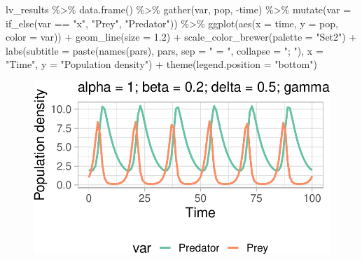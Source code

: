 \documentclass[
  letterpaper,
  DIV=11,
  numbers=noendperiod]{scrartcl}
\newenvironment{Shaded}{\begin{snugshade}}{\end{snugshade}}
\newcommand{\AttributeTok}[1]{\textcolor[rgb]{0.40,0.45,0.13}{#1}}
\newcommand{\FloatTok}[1]{\textcolor[rgb]{0.68,0.00,0.00}{#1}}
\newcommand{\FunctionTok}[1]{\textcolor[rgb]{0.28,0.35,0.67}{#1}}
\newcommand{\NormalTok}[1]{\textcolor[rgb]{0.00,0.23,0.31}{#1}}
\newcommand{\SpecialCharTok}[1]{\textcolor[rgb]{0.37,0.37,0.37}{#1}}
\newcommand{\StringTok}[1]{\textcolor[rgb]{0.13,0.47,0.30}{#1}}
\begin{document}
\begin{Shaded}
\begin{Highlighting}[]
\NormalTok{lv\_results }\SpecialCharTok{\%\textgreater{}\%} 
  \FunctionTok{data.frame}\NormalTok{() }\SpecialCharTok{\%\textgreater{}\%} 
  \FunctionTok{gather}\NormalTok{(var, pop, }\SpecialCharTok{{-}}\NormalTok{time) }\SpecialCharTok{\%\textgreater{}\%} 
  \FunctionTok{mutate}\NormalTok{(}\AttributeTok{var =} \FunctionTok{if\_else}\NormalTok{(var }\SpecialCharTok{==} \StringTok{"x"}\NormalTok{, }\StringTok{"Prey"}\NormalTok{, }\StringTok{"Predator"}\NormalTok{)) }\SpecialCharTok{\%\textgreater{}\%} 
  \FunctionTok{ggplot}\NormalTok{(}\FunctionTok{aes}\NormalTok{(}\AttributeTok{x =}\NormalTok{ time, }\AttributeTok{y =}\NormalTok{ pop, }\AttributeTok{color =}\NormalTok{ var)) }\SpecialCharTok{+}
    \FunctionTok{geom\_line}\NormalTok{(}\AttributeTok{size =} \FloatTok{1.2}\NormalTok{) }\SpecialCharTok{+}
    \FunctionTok{scale\_color\_brewer}\NormalTok{(}\AttributeTok{palette =} \StringTok{"Set2"}\NormalTok{) }\SpecialCharTok{+}
    \FunctionTok{labs}\NormalTok{(}\AttributeTok{subtitle =} \FunctionTok{paste}\NormalTok{(}\FunctionTok{names}\NormalTok{(pars), pars, }\AttributeTok{sep =} \StringTok{" = "}\NormalTok{, }\AttributeTok{collapse =} \StringTok{"; "}\NormalTok{),}
         \AttributeTok{x =} \StringTok{"Time"}\NormalTok{, }\AttributeTok{y =} \StringTok{"Population density"}\NormalTok{) }\SpecialCharTok{+} 
    \FunctionTok{theme}\NormalTok{(}\AttributeTok{legend.position =} \StringTok{"bottom"}\NormalTok{)}
\end{Highlighting}
\end{Shaded}

\begin{figure}[H]

{\centering \includegraphics{ecological_interactions_files/figure-pdf/unnamed-chunk-12-1.pdf}

}

\end{figure}
\end{document}
